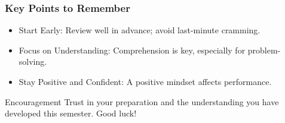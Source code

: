 \documentclass[aspectratio=169]{beamer}
\begin{document}
\begin{frame}[fragile]
    \frametitle{Key Points to Remember}
    \begin{itemize}
        \item Start Early: Review well in advance; avoid last-minute cramming.
        \item Focus on Understanding: Comprehension is key, especially for problem-solving.
        \item Stay Positive and Confident: A positive mindset affects performance.
    \end{itemize}
    \begin{block}{Encouragement}
        Trust in your preparation and the understanding you have developed this semester. Good luck!
    \end{block}
\end{frame}
\end{document}
